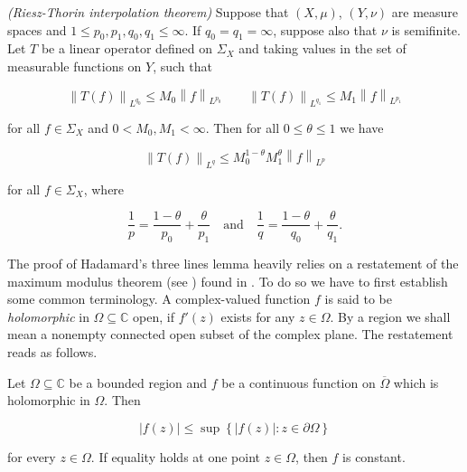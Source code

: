 \begin{mdframed}
	\begin{theorem}\emph{(Riesz-Thorin interpolation theorem)}
		Suppose that $(X,\mu)$, $(Y,\nu)$ are measure spaces and $1 \leqslant p_0,p_1,q_0,q_1 \leqslant \infty$. If $q_0 = q_1 = \infty$, suppose also that $\nu$ is semifinite. Let $T$ be a linear operator defined on $\Sigma_X$ and taking values in the set of measurable functions on $Y$, such that

		\begin{equation}
			\left\|T(f)\right\|_{L^{q_0}} \leqslant M_0\left\|f\right\|_{L^{p_0}} \qquad \left\|T(f)\right\|_{L^{q_1}} \leqslant M_1\left\|f\right\|_{L^{p_1}}
			\label{hyp:Lq0Lq1}
		\end{equation}

		for all $f \in \Sigma_X$ and $0 < M_0,M_1 < \infty$. Then for all $0 \leqslant \theta \leqslant 1$ we have

		\begin{equation}
			\left\|T(f)\right\|_{L^q} \leqslant M_0^{1 - \theta}M_1^\theta\left\|f\right\|_{L^p}
			\label{est:boundTf}
		\end{equation}

		for all $f \in \Sigma_X$, where

		\begin{equation*}
			\frac{1}{p} = \frac{1 - \theta}{p_0} + \frac{\theta}{p_1} \quad \text{and} \quad \frac{1}{q} = \frac{1 - \theta}{q_0} + \frac{\theta}{q_1}.
		\end{equation*}
		\label{thm:Riesz_Thorin}
	\end{theorem}
\end{mdframed}

\vspace{2mm}

The proof of Hadamard's three lines lemma heavily relies on a restatement of the maximum modulus theorem (see \cite[212]{rudin:rc_analysis:1987}) found in \cite[253]{rudin:rc_analysis:1987}. To do so we have to first establish some common terminology. A complex-valued function $f$ is said to be \emph{holomorphic} in $\Omega \subseteq \mathbb{C}$ open, if $f'(z)$ exists for any $z \in \Omega$. By a region we shall mean a nonempty connected open subset of the complex plane. The restatement reads as follows.

\begin{theorem*}
	Let $\Omega \subseteq \mathbb{C}$ be a bounded region and $f$ be a continuous function on $\overline{\Omega}$ which is holomorphic in $\Omega$. Then 

	\begin{equation*}
		\left| f(z)\right| \leqslant \sup\left\{ \left|f(z) \right| : z \in \partial\Omega\right\}
	\end{equation*}

	for every $z \in \Omega$. If equality holds at one point $z \in \Omega$, then $f$ is constant.
\end{theorem*}

